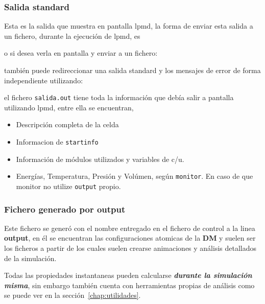 \subsubsection{Salida standard}
Esta es la salida que muestra en pantalla lpmd, la forma de enviar esta salida a un fichero, durante la ejecuci\'on de lpmd, es


o si desea verla en pantalla y enviar a un fichero:


tambi\'en puede redireccionar una salida standard y los mensajes de error de forma independiente utilizando:


el fichero \verb|salida.out| tiene toda la informaci\'on que deb\'ia salir a pantalla utilizando lpmd, entre ella se encuentran,

\begin{itemize}
 \item Descripci\'on completa de la celda
 \item Informacion de \verb|startinfo|
 \item Informaci\'on de m\'odulos utilizados y variables de c/u.
 \item Energ\'ias, Temperatura, Presi\'on y Vol\'umen, seg\'un \verb|monitor|. En caso de que monitor no utilize \verb|output| propio.
\end{itemize}


\subsubsection{Fichero generado por output}
Este fichero se gener\'o con el nombre entregado en el fichero de control a la linea \textbf{output}, en \'el se encuentran las configuraciones atomicas de la \textbf{DM} y suelen ser los ficheros a partir de los cuales suelen crearse animaciones y an\'alisis detallados de la simulaci\'on.

Todas las propiedades instantaneas pueden calcularse \textit{\textbf{durante la simulaci\'on misma}}, sin embargo \lpmd tambi\'en cuenta con herramientas propias de an\'alisis como se puede ver en la secci\'on~\ref{chap:utilidades}.

